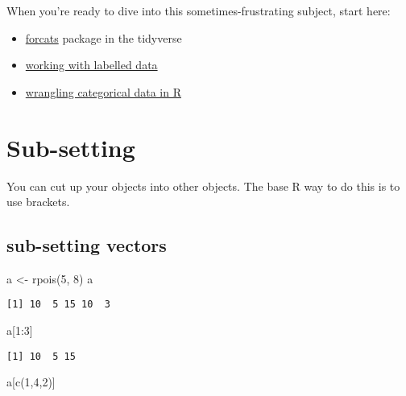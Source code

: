 \documentclass[
  letterpaper,
  DIV=11,
  numbers=noendperiod]{scrreprt}
\newenvironment{Shaded}{\begin{snugshade}}{\end{snugshade}}
\newcommand{\DecValTok}[1]{\textcolor[rgb]{0.68,0.00,0.00}{#1}}
\newcommand{\FunctionTok}[1]{\textcolor[rgb]{0.28,0.35,0.67}{#1}}
\newcommand{\NormalTok}[1]{\textcolor[rgb]{0.00,0.23,0.31}{#1}}
\newcommand{\OtherTok}[1]{\textcolor[rgb]{0.00,0.23,0.31}{#1}}
\newcommand{\SpecialCharTok}[1]{\textcolor[rgb]{0.37,0.37,0.37}{#1}}
\providecommand{\tightlist}{%
  \setlength{\itemsep}{0pt}\setlength{\parskip}{0pt}}\usepackage{longtable,booktabs,array}
\begin{document}
When you're ready to dive into this sometimes-frustrating subject, start
here:

\begin{itemize}
\tightlist
\item
  \href{https://forcats.tidyverse.org/}{forcats} package in the
  tidyverse
\item
  \href{https://cran.r-project.org/web/packages/sjlabelled/vignettes/labelleddata.html}{working
  with labelled data}
\item
  \href{https://peerj.com/preprints/3163/}{wrangling categorical data in
  R}
\end{itemize}

\section{Sub-setting}\label{sub-setting}

You can cut up your objects into other objects. The base R way to do
this is to use brackets.

\subsection{sub-setting vectors}\label{sub-setting-vectors}

\begin{Shaded}
\begin{Highlighting}[]
\NormalTok{a }\OtherTok{\textless{}{-}} \FunctionTok{rpois}\NormalTok{(}\DecValTok{5}\NormalTok{, }\DecValTok{8}\NormalTok{)}
\NormalTok{a}
\end{Highlighting}
\end{Shaded}

\begin{verbatim}
[1] 10  5 15 10  3
\end{verbatim}

\begin{Shaded}
\begin{Highlighting}[]
\NormalTok{a[}\DecValTok{1}\SpecialCharTok{:}\DecValTok{3}\NormalTok{]}
\end{Highlighting}
\end{Shaded}

\begin{verbatim}
[1] 10  5 15
\end{verbatim}

\begin{Shaded}
\begin{Highlighting}[]
\NormalTok{a[}\FunctionTok{c}\NormalTok{(}\DecValTok{1}\NormalTok{,}\DecValTok{4}\NormalTok{,}\DecValTok{2}\NormalTok{)]}
\end{Highlighting}
\end{Shaded}
\end{document}
